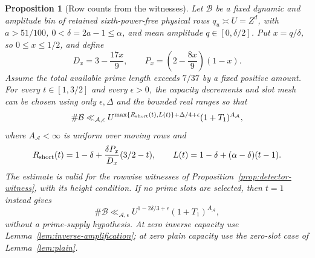 \documentclass[11pt,a4paper]{article}
\numberwithin{equation}{section}
\numberwithin{figure}{section}
\newtheorem{proposition}[theorem]{Proposition}
\theoremstyle{definition}
\theoremstyle{remark}
\begin{document}
\begin{proposition}[Row counts from the witnesses]\label{prop:detector-counts}
Let \(\mathcal B\) be a fixed dynamic and amplitude bin of retained
sixth-power-free physical rows \(q_u\asymp U=Z^d\), with
\(a>51/100\), \(0<\delta=2a-1\le\alpha\), and mean amplitude
\(q\in[0,\delta/2]\).  Put \(x=q/\delta\), so \(0\le x\le1/2\),
and define
\[
 D_x=3-\frac{17x}{9},\qquad
 P_x=\left(2-\frac{8x}{9}\right)(1-x).
\]
Assume the total available prime length exceeds \(7/37\) by a
fixed positive amount.  For every \(t\in[1,3/2]\) and every
\(\epsilon>0\), the capacity decrements and slot mesh can be chosen
using only \(\epsilon,\Delta\) and the bounded real ranges so that
\[
 \#\mathcal B\ll_{\mathcal A,\epsilon}
 U^{\max\{R_{\rm short}(t),L(t)\}+\Delta/4+\epsilon}
 (1+T_1)^{A_{\mathcal A}},
\]
where \(A_{\mathcal A}<\infty\) is uniform over moving rows and
\[
 R_{\rm short}(t)=1-\delta+\frac{\delta P_x}{D_x}(3/2-t),
 \qquad
 L(t)=1-\delta+(\alpha-\delta)(t-1).
\]
The estimate is valid for the rowwise witnesses of
Proposition~\ref{prop:detector-witness}, with its height condition.
If no prime slots are selected, then \(t=1\) instead gives
\[
 \#\mathcal B\ll_{\mathcal A,\epsilon}
 U^{1-2\delta/3+\epsilon}(1+T_1)^{A_{\mathcal A}},
\]
without a prime-supply hypothesis.  At zero inverse capacity use
Lemma~\ref{lem:inverse-amplification}; at zero plain capacity use
the zero-slot case of Lemma~\ref{lem:plain}.
\end{proposition}
\end{document}
